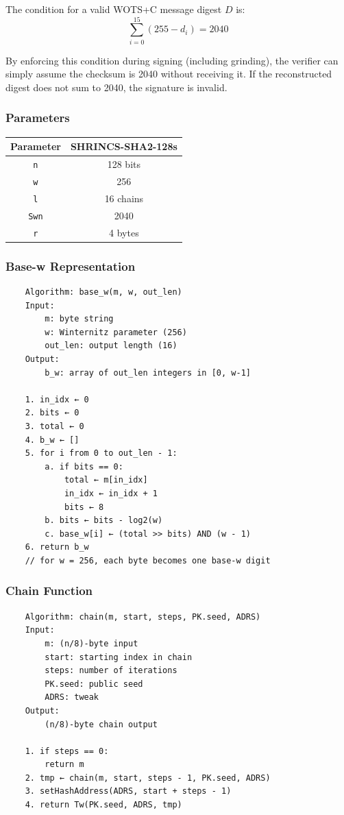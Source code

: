 The condition for a valid WOTS+C message digest $D$ is:
$$\sum_{i=0}^{15} (255 - d_i) = 2040$$

By enforcing this condition during signing (including grinding), the verifier can simply assume 
the checksum is 2040 without receiving it. If the reconstructed digest does not sum to 2040, the 
signature is invalid. 

\subsubsection{Parameters}

\begin{center}
\begin{tabular}{ c c }
 Parameter & SHRINCS-SHA2-128s \\ 
 \hline
 \texttt{n} & 128 bits \\
 \texttt{w} & 256 \\
 \texttt{l} & 16 chains \\
 \texttt{Swn} & 2040 \\
 \texttt{r} & 4 bytes
\end{tabular}
\end{center}

\subsubsection{Base-w Representation}
\begin{verbatim}
    Algorithm: base_w(m, w, out_len)
    Input: 
        m: byte string
        w: Winternitz parameter (256)
        out_len: output length (16)
    Output: 
        b_w: array of out_len integers in [0, w-1]
    
    1. in_idx ← 0
    2. bits ← 0
    3. total ← 0
    4. b_w ← []
    5. for i from 0 to out_len - 1:
        a. if bits == 0:
            total ← m[in_idx]
            in_idx ← in_idx + 1
            bits ← 8
        b. bits ← bits - log2(w)
        c. base_w[i] ← (total >> bits) AND (w - 1)
    6. return b_w
    // for w = 256, each byte becomes one base-w digit
\end{verbatim} 

\subsubsection{Chain Function}
\begin{verbatim}
    Algorithm: chain(m, start, steps, PK.seed, ADRS)
    Input:
        m: (n/8)-byte input
        start: starting index in chain
        steps: number of iterations
        PK.seed: public seed
        ADRS: tweak
    Output:
        (n/8)-byte chain output

    1. if steps == 0:
        return m
    2. tmp ← chain(m, start, steps - 1, PK.seed, ADRS)
    3. setHashAddress(ADRS, start + steps - 1)
    4. return Tw(PK.seed, ADRS, tmp)
\end{verbatim}

